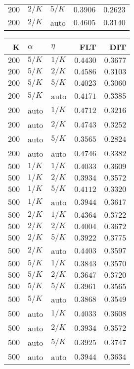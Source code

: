 \begin{table}
\begin{spacing}{1.2}
{\begin{tabular}{rll|rr}
$200$ &  $2/K$ &  $5/K$ &         $0.3906$ & $0.2623$ \\
$200$ &  $2/K$ &   auto &         $0.4605$ & $0.3140$ \\
\bottomrule
\end{tabular}
} \hfill \parbox{.45\linewidth}{\centering \begin{tabular}{rll|rr}
\toprule
    K &  $\alpha$ &    $\eta$ & FLT &        DIT \\
\midrule
$200$ &  $5/K$ &  $1/K$ &         $0.4430$ &      $0.3677$ \\
$200$ &  $5/K$ &  $2/K$ &         $0.4586$ &      $0.3103$ \\
$200$ &  $5/K$ &  $5/K$ &         $0.4023$ &      $0.3060$ \\
$200$ &  $5/K$ &   auto &         $0.4171$ &      $0.3385$ \\
$200$ &   auto &  $1/K$ &         $0.4712$ &      $0.3216$ \\
$200$ &   auto &  $2/K$ &         $0.4743$ &      $0.3252$ \\
$200$ &   auto &  $5/K$ &         $0.3565$ &      $0.2824$ \\
$200$ &   auto &   auto &         $0.4746$ &      $0.3382$ \\
$500$ &  $1/K$ &  $1/K$ &         $0.4033$ &      $0.3609$ \\
$500$ &  $1/K$ &  $2/K$ &         $0.3934$ &      $0.3572$ \\
$500$ &  $1/K$ &  $5/K$ &         $0.4112$ &      $0.3320$ \\
$500$ &  $1/K$ &   auto &         $0.3944$ &      $0.3617$ \\
$500$ &  $2/K$ &  $1/K$ &         $0.4364$ &      $0.3722$ \\
$500$ &  $2/K$ &  $2/K$ &         $0.4004$ &      $0.3672$ \\
$500$ &  $2/K$ &  $5/K$ &         $0.3922$ & $\bm{0.3775}$ \\
$500$ &  $2/K$ &   auto &         $0.4403$ &      $0.3597$ \\
$500$ &  $5/K$ &  $1/K$ &         $0.3843$ &      $0.3570$ \\
$500$ &  $5/K$ &  $2/K$ &         $0.3647$ &      $0.3720$ \\
$500$ &  $5/K$ &  $5/K$ &         $0.3961$ &      $0.3565$ \\
$500$ &  $5/K$ &   auto &         $0.3868$ &      $0.3549$ \\
$500$ &   auto &  $1/K$ &         $0.4033$ &      $0.3608$ \\
$500$ &   auto &  $2/K$ &         $0.3934$ &      $0.3572$ \\
$500$ &   auto &  $5/K$ &         $0.3925$ &      $0.3747$ \\
$500$ &   auto &   auto &         $0.3944$ &      $0.3634$ \\
\bottomrule
\end{tabular}
}
\end{spacing}
\end{table}
